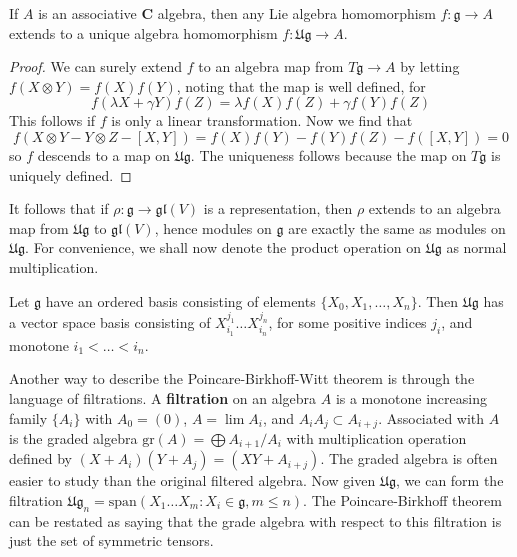 \begin{theorem}
    If $A$ is an associative $\mathbf{C}$ algebra, then any Lie algebra homomorphism $f: \mathfrak{g} \to A$ extends to a unique algebra homomorphism $f: \mathfrak{Ug} \to A$.
\end{theorem}
\begin{proof}
    We can surely extend $f$ to an algebra map from $T\mathfrak{g} \to A$ by letting $f(X \otimes Y) = f(X)f(Y)$, noting that the map is well defined, for
    \[ f(\lambda X + \gamma Y) f(Z) = \lambda f(X) f(Z) + \gamma f(Y) f(Z) \]
    This follows if $f$ is only a linear transformation. Now we find that
    \[ f(X \otimes Y - Y \otimes Z - [X,Y]) = f(X)f(Y) - f(Y)f(Z) - f([X,Y]) = 0 \]
    so $f$ descends to a map on $\mathfrak{Ug}$. The uniqueness follows because the map on $T\mathfrak{g}$ is uniquely defined.
\end{proof}

It follows that if $\rho: \mathfrak{g} \to \mathfrak{gl}(V)$ is a representation, then $\rho$ extends to an algebra map from $\mathfrak{Ug}$ to $\mathfrak{gl}(V)$, hence modules on $\mathfrak{g}$ are exactly the same as modules on $\mathfrak{Ug}$. For convenience, we shall now denote the product operation on $\mathfrak{Ug}$ as normal multiplication.

\begin{theorem}
    Let $\mathfrak{g}$ have an ordered basis consisting of elements $\{ X_0, X_1, \dots, X_n \}$. Then $\mathfrak{Ug}$ has a vector space basis consisting of $X_{i_1}^{j_1} \dots X_{i_n}^{j_n}$, for some positive indices $j_i$, and monotone $i_1 < \dots < i_n$.
\end{theorem}

Another way to describe the Poincare-Birkhoff-Witt theorem is through the language of filtrations. A {\bf filtration} on an algebra $A$ is a monotone increasing family $\{ A_i \}$ with $A_0 = (0)$, $A = \lim A_i$, and $A_i A_j \subset A_{i + j}$. Associated with $A$ is the graded algebra $\text{gr}(A) = \bigoplus A_{i+1}/A_i$ with multiplication operation defined by $(X + A_i)(Y + A_j) = (XY + A_{i+j})$. The graded algebra is often easier to study than the original filtered algebra. Now given $\mathfrak{Ug}$, we can form the filtration $\mathfrak{Ug}_n = \text{span}(X_1 \dots X_m : X_i \in \mathfrak{g}, m \leq n)$. The Poincare-Birkhoff theorem can be restated as saying that the grade algebra with respect to this filtration is just the set of symmetric tensors.

